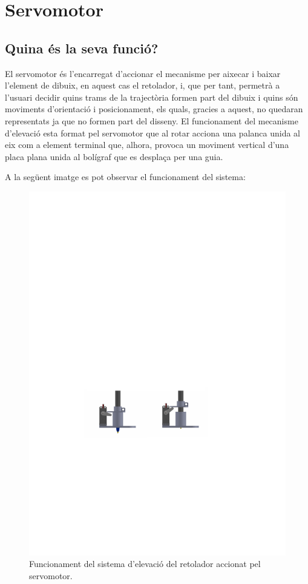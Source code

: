 \section {Servomotor}

\subsection{Quina és la seva funció?}

El servomotor és l’encarregat d’accionar el mecanisme per aixecar i baixar l’element de dibuix, en aquest cas el retolador, i, que per tant, permetrà a l’usuari decidir quins trams de la trajectòria formen part del dibuix i quins són moviments d’orientació i posicionament, els quals, gracies a aquest, no quedaran representats ja que no formen part del disseny. El funcionament del mecanisme d’elevació esta format pel servomotor que al rotar acciona una palanca unida al eix com a element terminal que, alhora, provoca un moviment vertical d’una placa plana unida al bolígraf que es desplaça per una guia.  

A la següent imatge es pot observar el funcionament del sistema:

\begin{figure}[H]
	\centering
	\includegraphics{elevacio}
	\caption{Funcionament del sistema d'elevació del retolador accionat pel servomotor.}
	\label{fig:elevacio}
\end{figure}

